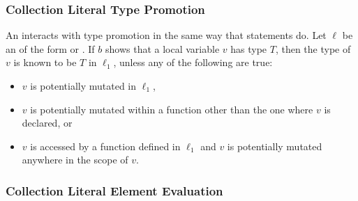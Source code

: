 \documentclass[makeidx]{article}
\begin{document}
{%


\subsubsection{Collection Literal Type Promotion}

\LMHash{}%
An  interacts with type promotion
in the same way that \IF{} statements do.
Let $\ell$ be an  of the form
 or
.
If $b$ shows that a local variable $v$ has type $T$, then
the type of $v$ is known to be $T$ in $\ell_1$,
unless any of the following are true:

\begin{itemize}
\item $v$ is potentially mutated in $\ell_1$,
\item $v$ is potentially mutated within a function
  other than the one where $v$ is declared, or
\item $v$ is accessed by a function defined in $\ell_1$ and
  $v$ is potentially mutated anywhere in the scope of $v$.
\end{itemize}



\subsubsection{Collection Literal Element Evaluation}

}
\end{document}
